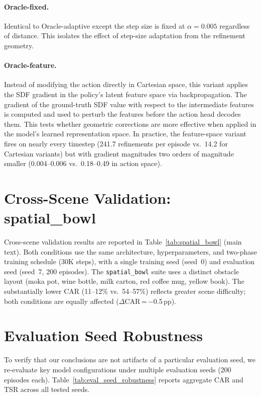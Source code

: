\paragraph{Oracle-fixed.} Identical to Oracle-adaptive except the step size is fixed at $\alpha = 0.005$ regardless of distance. This isolates the effect of step-size adaptation from the refinement geometry.

\paragraph{Oracle-feature.} Instead of modifying the action directly in Cartesian space, this variant applies the SDF gradient in the policy's latent feature space via backpropagation. The gradient of the ground-truth SDF value with respect to the intermediate features is computed and used to perturb the features before the action head decodes them. This tests whether geometric corrections are more effective when applied in the model's learned representation space. In practice, the feature-space variant fires on nearly every timestep (241.7 refinements per episode vs.\ 14.2 for Cartesian variants) but with gradient magnitudes two orders of magnitude smaller (0.004--0.006 vs.\ 0.18--0.49 in action space).


\section{Cross-Scene Validation: spatial\_bowl}
\label{sec:appendix_spatial_bowl}

Cross-scene validation results are reported in Table~\ref{tab:spatial_bowl} (main text). Both conditions use the same architecture, hyperparameters, and two-phase training schedule (30K steps), with a single training seed (seed~0) and evaluation seed (seed~7, 200 episodes). The \texttt{spatial\_bowl} suite uses a distinct obstacle layout (moka pot, wine bottle, milk carton, red coffee mug, yellow book). The substantially lower CAR (11--12\% vs.\ 54--57\%) reflects greater scene difficulty; both conditions are equally affected ($\Delta$CAR\,=\,$-$0.5\,pp).


\section{Evaluation Seed Robustness}
\label{sec:appendix_eval_seed}

To verify that our conclusions are not artifacts of a particular evaluation seed, we re-evaluate key model configurations under multiple evaluation seeds (200 episodes each). Table~\ref{tab:eval_seed_robustness} reports aggregate CAR and TSR across all tested seeds.

